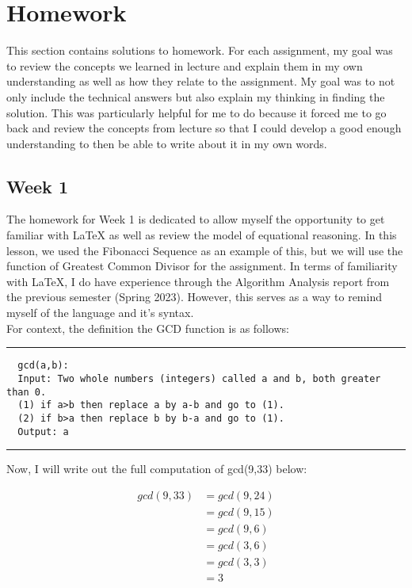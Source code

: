 \documentclass{article}
\theoremstyle{theorem}
\theoremstyle{definition}
\theoremstyle{remark}
\begin{document}
\section{Homework}\label{homework}
This section contains solutions to homework. For each assignment, my goal was to review the concepts we learned in lecture and explain them in my own understanding 
as well as how they relate to the assignment. My goal was to not only include the technical answers but also explain my thinking in finding the solution. This was 
particularly helpful for me to do because it forced me to go back and review the concepts from lecture so that I could develop a good enough understanding to then 
be able to write about it in my own words. 


\subsection{Week 1}

The homework for Week 1 is dedicated to allow myself the opportunity to get familiar with LaTeX as well as review the model of equational reasoning. 
In this lesson, we used the Fibonacci Sequence as an example of this, but we will use the function of Greatest Common Divisor for the assignment.
In terms of familiarity with LaTeX, I do have experience through the Algorithm Analysis report from the previous 
semester (Spring 2023). However, this serves as a way to remind myself of the language and it's syntax. \\


For context, the definition the GCD function is as follows:\\
\noindent
  {\color{gray} \rule{\linewidth}{0.05mm}}
\begin{center}
  \begin{verbatim}
  gcd(a,b): 
  Input: Two whole numbers (integers) called a and b, both greater than 0.
  (1) if a>b then replace a by a-b and go to (1).
  (2) if b>a then replace b by b-a and go to (1).
  Output: a
  \end{verbatim}
\end{center}
\noindent
  {\color{gray} \rule{\linewidth}{0.05mm}}

Now, I will write out the full computation of gcd(9,33) below:

\begin{align*}
  gcd(9,33) & = gcd(9,24)\\
            & = gcd(9,15)\\
            & = gcd(9,6)\\
            & = gcd(3,6)\\
            & = gcd(3,3)\\
            & = 3
\end{align*}
\end{document}

